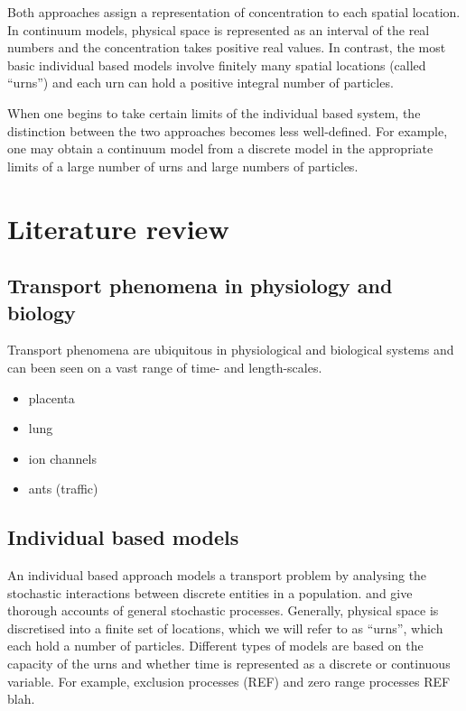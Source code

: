 Both approaches assign a representation of concentration to each
spatial location. In continuum models, physical space is represented as an
interval of the real numbers and the concentration takes positive real values.
In contrast, the most basic individual based models involve finitely many
spatial locations (called ``urns'') and each urn can hold a positive integral
number of particles.

When one begins to take certain limits of the individual based system, the
distinction between the two approaches becomes less well-defined. For example,
one may obtain a continuum model from a discrete model in the appropriate limits
of a large number of urns and large numbers of particles. 

\section{Literature review}
\subsection{Transport phenomena in physiology and biology}
Transport phenomena are ubiquitous in physiological and biological systems and
can been seen on a vast range of time- and length-scales.

\begin{itemize}
    \item placenta
    \item lung \cite{grebenkov2005diffusion}
    \item ion channels
    \item ants (traffic)
\end{itemize}

\subsection{Individual based models}

An individual based approach models a transport problem by analysing the
stochastic interactions between discrete entities in a population.
\citet{van2007stochastic} and \citet{gardiner2009stochastic} give thorough
accounts of general stochastic processes. Generally, physical space is
discretised into a finite set of locations, which we will refer to as ``urns'',
which each hold a number of particles. Different types of models are based on
the capacity of the urns and whether time is represented as a discrete or
continuous variable. For example, exclusion processes (REF) and zero range
processes REF blah.

